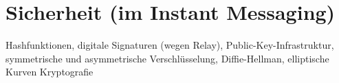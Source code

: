 \section{Sicherheit (im Instant Messaging)}
\label{sec:sicherheit_im}

Hashfunktionen, digitale Signaturen (wegen Relay), Public-Key-Infrastruktur, symmetrische und asymmetrische Verschlüsselung, Diffie-Hellman, elliptische Kurven Kryptografie